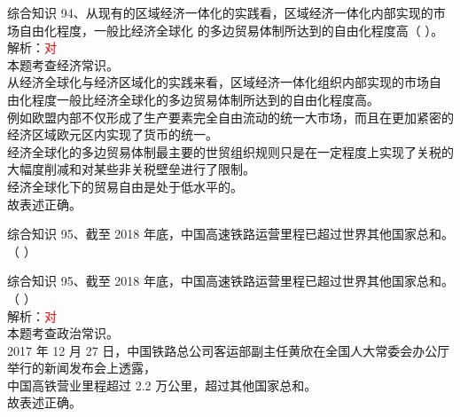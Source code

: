 \documentclass[aspectratio=169]{beamer}
\begin{document}
\begin{frame}[t]{综合知识}
    94、从现有的区域经济一体化的实践看，区域经济一体化内部实现的市场自由化程度，一般比经济全球化
    的多边贸易体制所达到的自由化程度高（ ）。\\
    解析：\textcolor{red}{对 \checkmark}\\
    本题考查经济常识。\\
    从经济全球化与经济区域化的实践来看，区域经济一体化组织内部实现的市场自
    由化程度一般比经济全球化的多边贸易体制所达到的自由化程度高。\\
    例如欧盟内部不仅形成了生产要素完全自由流动的统一大市场，而且在更加紧密的经济区域欧元区内实现了货币的统一。\\
    经济全球化的多边贸易体制最主要的世贸组织规则只是在一定程度上实现了关税的大幅度削减和对某些非关税壁垒进行了限制。\\
    经济全球化下的贸易自由是处于低水平的。\\
    故表述正确。
\end{frame}                           





\begin{frame}[t]{综合知识}
    95、截至 2018 年底，中国高速铁路运营里程已超过世界其他国家总和。（ ）
\end{frame}                           

\begin{frame}[t]{综合知识}
    95、截至 2018 年底，中国高速铁路运营里程已超过世界其他国家总和。（ ）\\
    解析：\textcolor{red}{对 \checkmark}\\
    本题考查政治常识。\\
    2017 年 12 月 27 日，中国铁路总公司客运部副主任黄欣在全国人大常委会办公厅
    举行的新闻发布会上透露，\\
    中国高铁营业里程超过 2.2 万公里，超过其他国家总和。\\
    故表述正确。
\end{frame}                           
\end{document}
